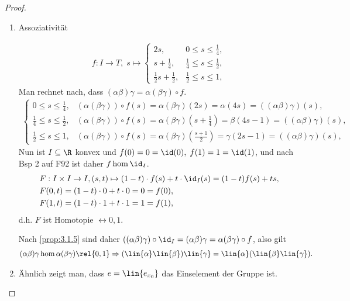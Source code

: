 \begin{proof}
\begin{enumerate}[label=\arabic{*}.)]
  \item Assoziativität
  
  \begin{align*}
  f: I\to T,\;s\mapsto\begin{cases}
                     2s,& 0\le s\le \frac{1}{4},\\
                     s+\frac{1}{4}, & \frac{1}{4} \le s \le \frac{1}{2},\\
                     \frac{1}{2}s + \frac{1}{2}, & \frac{1}{2}\le s \le 1,
                     \end{cases}
  \end{align*}
Man rechnet nach, dass $(\alpha\beta)\gamma = \alpha(\beta\gamma)\circ f$.
\begin{align*}
\begin{cases}
0\le s\le \frac{1}{4}, & (\alpha(\beta\gamma))\circ f(s) =
\alpha(\beta\gamma)(2s) = \alpha(4s) = ((\alpha\beta)\gamma)(s),\\
\frac{1}{4} \le s \le \frac{1}{2}, & (\alpha(\beta\gamma))\circ f(s) =
\alpha(\beta\gamma)(s+\frac{1}{4}) = \beta(4s-1) = ((\alpha\beta)\gamma)(s),\\
\frac{1}{2} \le s\le 1, & (\alpha(\beta\gamma))\circ f(s) =
\alpha(\beta\gamma)(\frac{s+1}{2}) = \gamma(2s-1) = ((\alpha\beta)\gamma)(s),
\end{cases}
\end{align*}
Nun ist $I\subseteq\R$ konvex und $f(0) = 0 = \id(0),\; f(1) = 1 = \id(1)$, und
nach Bsp 2 auf F92 ist daher $f\hom \id_I$.
\begin{align*}
&F: I\times I \to I, (s,t)\mapsto (1-t)\cdot f(s) + t\cdot\id_I(s) = (1-t)f(s) +
ts,\\
&F(0,t) = (1-t)\cdot 0 + t\cdot 0 = 0 = f(0),\\
&F(1,t) = (1-t)\cdot 1 + t\cdot 1 = 1 = f(1),
\end{align*}
d.h. $F$ ist Homotopie $\rel{0,1}$.

Nach \ref{prop:3.1.5} sind daher $((\alpha\beta)\gamma)\circ\id_I =
(\alpha\beta)\gamma = \alpha(\beta\gamma)\circ f$, also gilt
\begin{align*}
(\alpha\beta)\gamma \hom \alpha(\beta\gamma) \rel{0,1} \Rightarrow
(\lin{\alpha}\lin{\beta})\lin{\gamma} = \lin{\alpha}(\lin{\beta}\lin{\gamma}).
\end{align*}
\item Ähnlich zeigt man, dass $e = \lin{e_{x_0}}$ das Einselement der Gruppe
ist.


\end{enumerate}
\end{proof}
